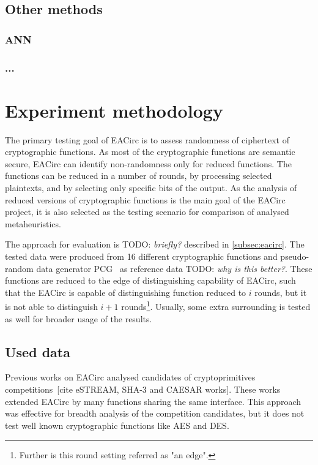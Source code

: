\documentclass[
  print, %
  Table,   %
  nolof,     %
  nolot,     %
  11pt, %
  oneside  %
]{fithesis3}
\newcommand{\todo}[1]{TODO: \textit{#1}}
\begin{document}
\section{Other methods}
\label{sec:opt-other}
\subsection{ANN}
\label{subsec:opt-other-ann}
\subsection{...}



\chapter{Experiment methodology}
\label{chap:method}

The primary testing goal of EACirc is to assess randomness of ciphertext of cryptographic functions. As most of the cryptographic functions are semantic secure, EACirc can identify non-randomness only for reduced functions. The functions can be reduced in a number of rounds, by processing selected plaintexts, and by selecting only specific bits of the output. As the analysis of reduced versions of cryptographic functions is the main goal of the EACirc project, it is also selected as the testing scenario for comparison of analysed metaheuristics.

The approach for evaluation is \todo{briefly?} described in \cref{subsec:eacirc}. The tested data were produced from 16 different cryptographic functions and pseudo-random data generator PCG~\cite{pcgGen} as reference data \todo{why is this better?}. These functions are reduced to the edge of distinguishing capability of EACirc, such that the EACirc is capable of distinguishing function reduced to $i$ rounds, but it is not able to distinguish $i+1$ rounds\footnote{Further is this round setting referred as "an edge".}. Usually, some extra surrounding is tested as well for broader usage of the results.

\section{Used data}
\label{sec:method-data}

Previous works on EACirc analysed candidates of cryptoprimitives competitions~\cite{estreamMgrThesis,sha3Thesis,ukropMgrThesis}[cite eSTREAM, SHA-3 and CAESAR works]. These works extended EACirc by many functions sharing the same interface. This approach was effective for breadth analysis of the competition candidates, but it does not test well known cryptographic functions like AES and DES.
\end{document}
